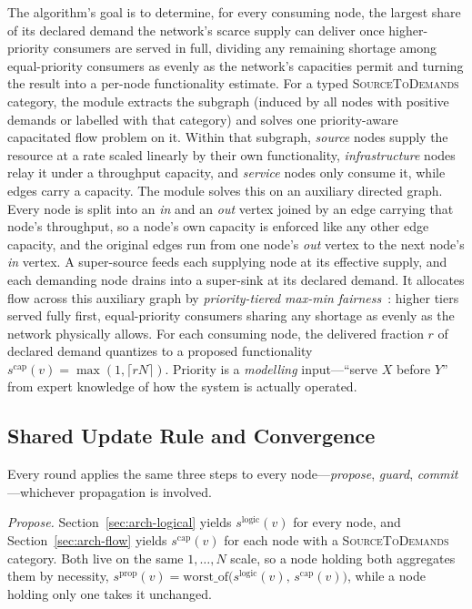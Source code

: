 \documentclass{svproc}
\newcommand{\worstof}{\mathrm{worst\_of}}
\begin{document}
The algorithm's goal is to determine, for every consuming node, the largest share of 
its declared demand the network's scarce supply can deliver once higher-priority 
consumers are served in full, dividing any remaining shortage among equal-priority 
consumers as evenly as the network's capacities permit and turning the result into 
a per-node functionality estimate.
  For a typed \textsc{SourceToDemands} category, the module extracts the subgraph 
  (induced by all nodes with positive demands or labelled with that category)
  and solves one priority-aware capacitated flow problem on it. Within that subgraph,
  \emph{source} nodes supply the resource at a rate scaled linearly by their own
  functionality, \emph{infrastructure} nodes relay it under a throughput capacity, and
  \emph{service} nodes only consume it, while edges carry a capacity. The module solves this on an auxiliary
  directed graph. Every node is split into an \emph{in} and an \emph{out} vertex joined by
  an edge carrying that node's throughput, so a node's own capacity is enforced like any
  other edge capacity, and the original edges run from one node's \emph{out} vertex to the next
  node's \emph{in} vertex. A super-source feeds each supplying node at its effective
  supply, and each demanding node drains into a super-sink at its declared demand. It allocates flow across this
  auxiliary graph by \emph{priority-tiered max-min fairness}~\cite{nace_tutorial_2006}: higher tiers
  served fully first, equal-priority consumers sharing any shortage as evenly as
  the network physically allows. For each consuming node, the delivered
  fraction $r$ of declared demand quantizes to a proposed functionality
  $s^{\mathrm{cap}}(v)=\max(1,\lceil r N\rceil)$. 
  Priority is a \emph{modelling} input---``serve $X$ before $Y$'' from expert knowledge of how the system is actually
  operated.

  \subsection{Shared Update Rule and Convergence}\label{sec:arch-pipeline}

  Every round applies the same three steps to every node---\emph{propose},
  \emph{guard}, \emph{commit}---whichever propagation is involved.

  \emph{Propose.} Section~\ref{sec:arch-logical} yields $s^{\mathrm{logic}}(v)$ for every
  node, and Section~\ref{sec:arch-flow} yields $s^{\mathrm{cap}}(v)$ for each node
  with a \textsc{SourceToDemands} category. Both live on the same $1,\ldots,N$
  scale, so a node holding both aggregates them by necessity,
  $s^{\mathrm{prop}}(v)=\worstof\big(s^{\mathrm{logic}}(v),\,s^{\mathrm{cap}}(v)\big)$,
  while a node holding only one takes it unchanged.
\end{document}
